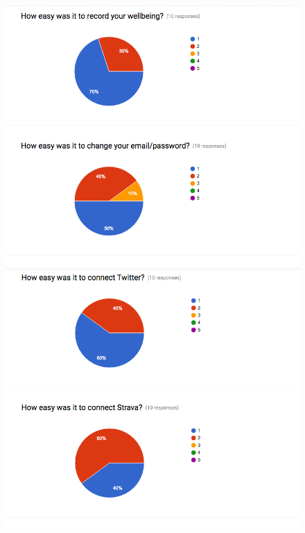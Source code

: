 \documentclass[11pt,openright,a4paper]{report}
\begin{document}
\begin{appendices}
\begin{figure}[ht]
  \centering
  \includegraphics[width=.9\textwidth]{i/testingresponses8.png}
  \includegraphics[width=.9\textwidth]{i/testingresponses9.png}
\end{figure}


\end{appendices}
\end{document}
